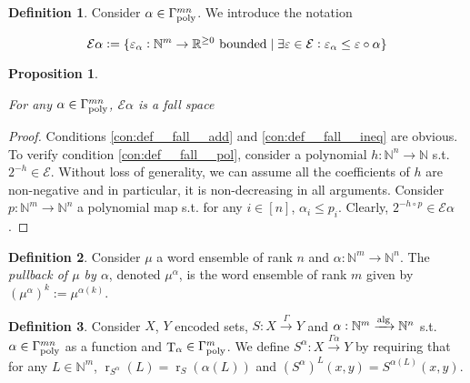 \documentclass{article}
\numberwithin{equation}{section}
\theoremstyle{definition}
\newtheorem{definition}{Definition}[section]
\theoremstyle{plain}
\newtheorem{proposition}{Proposition}[section]
\DeclareMathOperator{\T}{T}
\DeclareMathOperator{\R}{r}
\newcommand{\Nats}{\mathbb{N}}
\newcommand{\Reals}{\mathbb{R}}
\newcommand{\Fall}{\mathcal{E}}
\newcommand{\Alg}{\xrightarrow{\textnormal{alg}}}
\newcommand{\Scheme}{\xrightarrow{\Gamma}}
\begin{document}
\begin{samepage}
\begin{definition}

Consider ${\alpha \in \Gamma_{\textnormal{poly}}^{mn}}$. We introduce the notation

\begin{equation}
\label{eqn:tbd}
\Fall \alpha:=\{\varepsilon_\alpha: \Nats^m \rightarrow \Reals^{\geq 0} \textnormal{ bounded} \mid \exists \varepsilon \in \Fall: \varepsilon_\alpha \leq \varepsilon \circ \alpha\}
\end{equation}

\end{definition}
\end{samepage}

\begin{samepage}
\begin{proposition}
\label{prp:tbd}

For any ${\alpha \in \Gamma_{\textnormal{poly}}^{mn}}$, ${\Fall \alpha}$ is a fall space

\end{proposition}
\end{samepage}

\begin{proof}

Conditions \ref{con:def__fall__add} and \ref{con:def__fall__ineq} are obvious. To verify condition \ref{con:def__fall__pol}, consider a polynomial ${h: \Nats^n \rightarrow \Nats}$ s.t. ${2^{-h} \in \Fall}$. Without loss of generality, we can assume all the coefficients of ${h}$ are non-negative and in particular, it is non-decreasing in all arguments. Consider ${p: \Nats^m \rightarrow \Nats^n}$ a polynomial map s.t. for any ${i \in [n]}$, ${\alpha_i \leq p_i}$. Clearly, ${2^{-h \circ p} \in \Fall \alpha}$.
%
\end{proof}

\begin{samepage}
\begin{definition}

Consider ${\mu}$ a word ensemble of rank ${n}$ and ${\alpha: \Nats^m \rightarrow \Nats^n}$. The \emph{pullback of ${\mu}$ by ${\alpha}$}, denoted ${\mu^\alpha}$, is the word ensemble of rank ${m}$ given by ${(\mu^\alpha)^k:=\mu^{\alpha(k)}}$.

\end{definition}
\end{samepage}

\begin{samepage}
\begin{definition}

Consider ${X}$, ${Y}$ encoded sets, ${S: X \Scheme Y}$ and ${\alpha: \Nats^m \Alg \Nats^n}$ s.t. ${\alpha \in \Gamma_{\textnormal{poly}}^{mn}}$ as a function and ${\T_\alpha \in \Gamma_{\textnormal{poly}}^m}$. We define ${S^\alpha: X \xrightarrow{\Gamma \alpha} Y}$ by requiring that for any ${L \in \Nats^m}$, ${\R_{S^\alpha}(L)=\R_S(\alpha(L))}$ and ${(S^\alpha)^L(x,y)=S^{\alpha(L)}(x,y)}$.

\end{definition}
\end{samepage}
\end{document}

